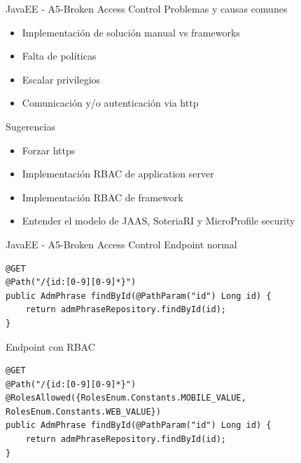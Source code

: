 \documentclass[aspectratio=169]{beamer}
\begin{document}
\begin{frame}{JavaEE - A5-Broken Access Control}
    Problemas y causas comunes
    \begin{itemize}
        \item Implementación de solución manual vs frameworks
        \item Falta de políticas 
        \item Escalar privilegios
        \item Comunicación y/o autenticación via http
    \end{itemize}
    
    Sugerencias
    \begin{itemize}
        \item Forzar https
        \item Implementación RBAC de application server
        \item Implementación RBAC de framework
        \item Entender el modelo de JAAS, SoteriaRI y MicroProfile security
    \end{itemize}
\end{frame}


\begin{frame}[fragile]{JavaEE - A5-Broken Access Control}
Endpoint normal
\begin{lstlisting}
@GET
@Path("/{id:[0-9][0-9]*}")
public AdmPhrase findById(@PathParam("id") Long id) {
    return admPhraseRepository.findById(id);
}
\end{lstlisting}	

Endpoint con RBAC
\begin{lstlisting}
@GET
@Path("/{id:[0-9][0-9]*}")
@RolesAllowed({RolesEnum.Constants.MOBILE_VALUE, RolesEnum.Constants.WEB_VALUE})
public AdmPhrase findById(@PathParam("id") Long id) {
    return admPhraseRepository.findById(id);
}
\end{lstlisting}	
    
\end{frame}
\end{document}
